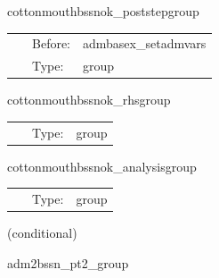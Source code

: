 \vspace{5mm}


\hspace{5mm} cottonmouthbssnok\_poststepgroup 

\hspace{5mm}{\it bssnok post-step routines } 


\hspace{5mm}

 \begin{tabular*}{160mm}{cll} 
~ & Before:  & admbasex\_setadmvars \\ 
~ & Type:  & group \\ 
\end{tabular*} 


\vspace{5mm}


\hspace{5mm} cottonmouthbssnok\_rhsgroup 

\hspace{5mm}{\it bssnok equations rhs computation } 


\hspace{5mm}

 \begin{tabular*}{160mm}{cll} 
~ & Type:  & group \\ 
\end{tabular*} 


\vspace{5mm}


\hspace{5mm} cottonmouthbssnok\_analysisgroup 

\hspace{5mm}{\it bssnok analysis routines } 


\hspace{5mm}

 \begin{tabular*}{160mm}{cll} 
~ & Type:  & group \\ 
\end{tabular*} 


\vspace{5mm}

   (conditional) 

\hspace{5mm} adm2bssn\_pt2\_group 

